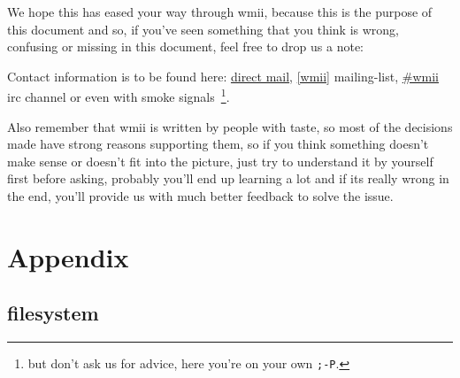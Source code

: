 \documentclass[12pt,a4paper]{article} %
\begin{document}
  We hope this has eased your way through wmii, because this is the
  purpose of this document and so, if you've seen something that you
  think is wrong, confusing or missing in this document, feel free
  to drop us a note:

  Contact information is to be found here:
  \href{http://wmii.de/index.php/BeginnersGuide}{direct mail},
  \href{http://wmii.de/index.php/MailingList}{[wmii]} mailing-list,
  \href{http://wmii.de/index.php/IRC}{\#wmii} irc channel or even
  with smoke signals~\footnote{ but don't ask us for advice, here
  you're on your own \texttt{;-P}.}.

  Also remember that wmii is written by people with taste, so most
  of the decisions made have strong reasons supporting them, so if
  you think something doesn't make sense or doesn't fit into the
  picture, just try to understand it by yourself first before
  asking, probably you'll end up learning a lot and if its really
  wrong in the end, you'll provide us with much better feedback to
  solve the issue.

\newpage

\section{Appendix}
\label{sec:appendix}

\subsection{filesystem}
\end{document}
